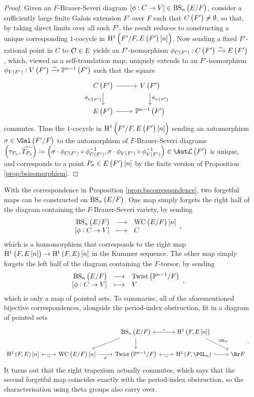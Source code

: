 \begin{proof}
Given an $ F $-Brauer-Severi diagram $ \sbr{\phi : C \to V} \in \BS{F} $, consider a sufficiently large finite Galois extension $ F' $ over $ F $ such that $ C\br{F'} \ne \emptyset $, so that, by taking direct limits over all such $ F' $, the result reduces to constructing a unique corresponding $ 1 $-cocycle in $ \H^1\br{F' / F, E\br{F'}\sbr{n}} $. Now sending a fixed $ F' $-rational point in $ C $ to $ \mathcal{O} \in E $ yields an $ F' $-isomorphism $ \phi_{C\br{F'}} : C\br{F'} \xrightarrow{\sim} E\br{F'} $, which, viewed as a self-translation map, uniquely extends to an $ F' $-isomorphism $ \phi_{V\br{F'}} : V\br{F'} \xrightarrow{\sim} \PP^{n - 1}\br{F'} $ such that the square
$$
\begin{tikzcd}
C\br{F'} \arrow{r} \arrow{d}[swap]{\phi_{C\br{F'}}} & V\br{F'} \arrow{d}{\phi_{V\br{F'}}} \\
E\br{F'} \arrow{r} & \PP^{n - 1}\br{F'}
\end{tikzcd}
$$
commutes. Thus the $ 1 $-cocycle in $ \H^1\br{F' / F, E\br{F'}\sbr{n}} $ sending an automorphism $ \sigma \in \Gal\br{F' / F} $ to the automorphism of $ F $-Brauer-Severi diagrams $ \br{\tau_{P_\sigma}, \widehat{T_{P_\sigma}}} \coloneqq \br{\sigma \cdot \phi_{C\br{F'}} \circ \phi_{C\br{F'}}^{-1}, \sigma \cdot \phi_{V\br{F'}} \circ \phi_{V\br{F'}}^{-1}} \in \Aut \LLL\br{F'} $ is unique, and corresponds to a point $ P_\sigma \in E\br{F'}\sbr{n} $ by the finite version of Proposition \ref{prop:bsisomorphism}.
\end{proof}

With the correspondence in Proposition \ref{prop:bscorrespondence}, two forgetful maps can be constructed on $ \BS{F} $. One map simply forgets the right half of the diagram containing the $ F $-Brauer-Severi variety, by sending
$$ \function{\BS{F}}{\WC{F}\sbr{n}}{\sbr{\phi : C \to V}}{C}, $$
which is a homomorphism that corresponds to the right map $ \HE[n]{F} \to \HE{F}\sbr{n} $ in the Kummer sequence. The other map simply forgets the left half of the diagram containing the $ F $-torsor, by sending
$$ \function{\BS{F}}{\Twist{\PP^{n - 1}}{F}}{\sbr{\phi : C \to V}}{V}, $$
which is only a map of pointed sets. To summarise, all of the aforementioned bijective correspondences, alongside the period-index obstruction, fit in a diagram of pointed sets
$$
\begin{tikzcd}
& & \BS{F} \arrow[leftrightarrow]{r}{\sim} \arrow{dl} \arrow{d} & \HE[n]{F} \arrow{dr}{\Ob_F} & \\
\HE{F}\sbr{n} \arrow[leftrightarrow]{r}[swap]{\sim} & \WC{F}\sbr{n} \arrow{r}[swap]{\phi} & \Twist{\PP^{n - 1}}{F} \arrow[leftrightarrow]{r}[swap]{\sim} & \H^1\br{F, \PGL_n} \arrow[hookrightarrow]{r} & \Br F
\end{tikzcd}.
$$
It turns out that the right trapezium actually commutes, which says that the second forgetful map coincides exactly with the period-index obstruction, so the characterisation using theta groups also carry over.

